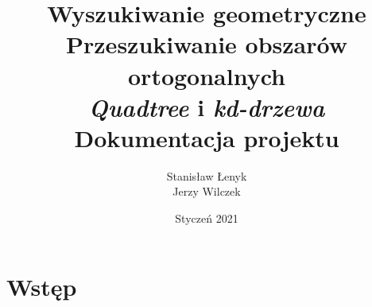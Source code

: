 \documentclass{article}
\title{\textbf{Wyszukiwanie geometryczne} \\ \textbf{Przeszukiwanie obszarów ortogonalnych} \\ \textit{Quadtree} i \textit{kd-drzewa} \\ Dokumentacja projektu}
\author{Stanisław Łenyk \\ Jerzy Wilczek}
\date{Styczeń 2021}
\begin{document}
\maketitle

\newpage

\tableofcontents

\newpage

\section{Wstęp}
\end{document}
